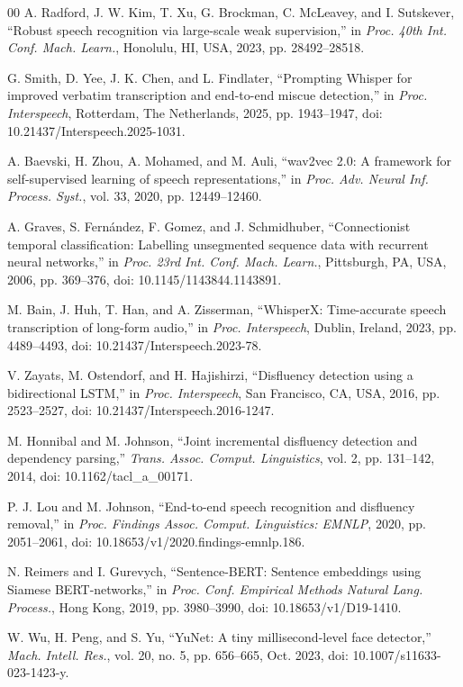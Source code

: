 \documentclass{ieeeaccess}
\begin{document}
\begin{thebibliography}{00}
 A. Radford, J. W. Kim, T. Xu, G. Brockman, C. McLeavey, and I. Sutskever, ``Robust speech recognition via large-scale weak supervision,'' in \emph{Proc. 40th Int. Conf. Mach. Learn.}, Honolulu, HI, USA, 2023, pp. 28492--28518.

 G. Smith, D. Yee, J. K. Chen, and L. Findlater, ``Prompting Whisper for improved verbatim transcription and end-to-end miscue detection,'' in \emph{Proc. Interspeech}, Rotterdam, The Netherlands, 2025, pp. 1943--1947, doi: 10.21437/Interspeech.2025-1031.

 A. Baevski, H. Zhou, A. Mohamed, and M. Auli, ``wav2vec 2.0: A framework for self-supervised learning of speech representations,'' in \emph{Proc. Adv. Neural Inf. Process. Syst.}, vol. 33, 2020, pp. 12449--12460.

 A. Graves, S. Fern\'{a}ndez, F. Gomez, and J. Schmidhuber, ``Connectionist temporal classification: Labelling unsegmented sequence data with recurrent neural networks,'' in \emph{Proc. 23rd Int. Conf. Mach. Learn.}, Pittsburgh, PA, USA, 2006, pp. 369--376, doi: 10.1145/1143844.1143891.

 M. Bain, J. Huh, T. Han, and A. Zisserman, ``WhisperX: Time-accurate speech transcription of long-form audio,'' in \emph{Proc. Interspeech}, Dublin, Ireland, 2023, pp. 4489--4493, doi: 10.21437/Interspeech.2023-78.

 V. Zayats, M. Ostendorf, and H. Hajishirzi, ``Disfluency detection using a bidirectional LSTM,'' in \emph{Proc. Interspeech}, San Francisco, CA, USA, 2016, pp. 2523--2527, doi: 10.21437/Interspeech.2016-1247.

 M. Honnibal and M. Johnson, ``Joint incremental disfluency detection and dependency parsing,'' \emph{Trans. Assoc. Comput. Linguistics}, vol. 2, pp. 131--142, 2014, doi: 10.1162/tacl\_a\_00171.

 P. J. Lou and M. Johnson, ``End-to-end speech recognition and disfluency removal,'' in \emph{Proc. Findings Assoc. Comput. Linguistics: EMNLP}, 2020, pp. 2051--2061, doi: 10.18653/v1/2020.findings-emnlp.186.

 N. Reimers and I. Gurevych, ``Sentence-BERT: Sentence embeddings using Siamese BERT-networks,'' in \emph{Proc. Conf. Empirical Methods Natural Lang. Process.}, Hong Kong, 2019, pp. 3980--3990, doi: 10.18653/v1/D19-1410.

 W. Wu, H. Peng, and S. Yu, ``YuNet: A tiny millisecond-level face detector,'' \emph{Mach. Intell. Res.}, vol. 20, no. 5, pp. 656--665, Oct. 2023, doi: 10.1007/s11633-023-1423-y.

\end{thebibliography}

\EOD
\end{document}
